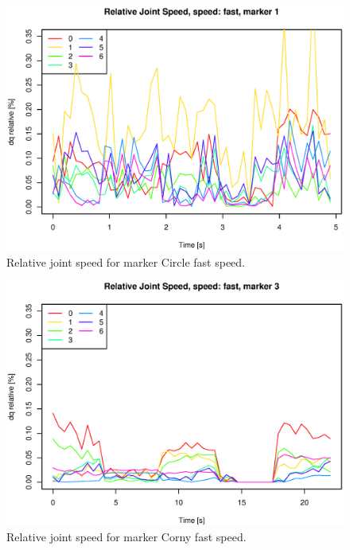 \begin{figure}[H]\centering\includegraphics[width=\fullImageWidth]{graphics/rovi_robot_joint_speed_fast_marker1.eps}    \caption{Relative joint speed for marker Circle fast speed.  }\label{fig:rovi_joint_speed_F_Circle} \end{figure}
\begin{figure}[H]\centering\includegraphics[width=\fullImageWidth]{graphics/rovi_robot_joint_speed_fast_marker3.eps}    \caption{Relative joint speed for marker Corny  fast speed.  }\label{fig:rovi_joint_speed_F_Corny } \end{figure}
